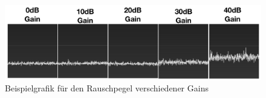 \begin{figure} [H]
	\centering
	\includegraphics[width=\linewidth]{../ref/noiseflooradjustment.png}
	\caption{Beispielgrafik für den Rauschpegel verschiedener Gains}
	\label{fig:noiseflooradjustment}
\end{figure}